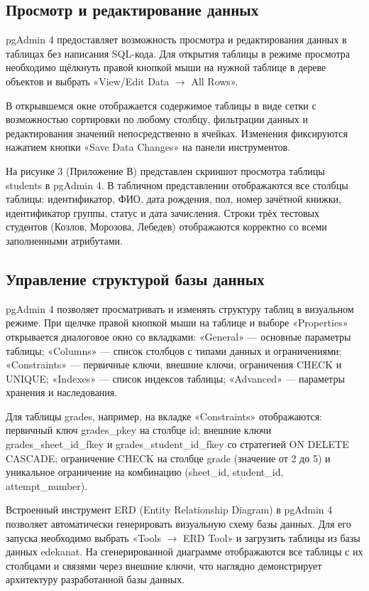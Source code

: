 \documentclass[14pt, a4paper]{extreport}
\begin{document}
\subsection{Просмотр и редактирование данных}
pgAdmin 4 предоставляет возможность просмотра и редактирования данных в таблицах без написания SQL-кода. Для открытия таблицы в режиме просмотра необходимо щёлкнуть правой кнопкой мыши на нужной таблице в дереве объектов и выбрать «View/Edit Data $\rightarrow$ All Rows».

В открывшемся окне отображается содержимое таблицы в виде сетки с возможностью сортировки по любому столбцу, фильтрации данных и редактирования значений непосредственно в ячейках. Изменения фиксируются нажатием кнопки «Save Data Changes» на панели инструментов.

На рисунке 3 (Приложение В) представлен скриншот просмотра таблицы students в pgAdmin 4. В табличном представлении отображаются все столбцы таблицы: идентификатор, ФИО, дата рождения, пол, номер зачётной книжки, идентификатор группы, статус и дата зачисления. Строки трёх тестовых студентов (Козлов, Морозова, Лебедев) отображаются корректно со всеми заполненными атрибутами.

\subsection{Управление структурой базы данных}
pgAdmin 4 позволяет просматривать и изменять структуру таблиц в визуальном режиме. При щелчке правой кнопкой мыши на таблице и выборе «Properties» открывается диалоговое окно со вкладками: «General» --- основные параметры таблицы; «Columns» --- список столбцов с типами данных и ограничениями; «Constraints» --- первичные ключи, внешние ключи, ограничения CHECK и UNIQUE; «Indexes» --- список индексов таблицы; «Advanced» --- параметры хранения и наследования.

Для таблицы grades, например, на вкладке «Constraints» отображаются: первичный ключ grades\_pkey на столбце id; внешние ключи grades\_sheet\_id\_fkey и grades\_student\_id\_fkey со стратегией ON DELETE CASCADE; ограничение CHECK на столбце grade (значение от 2 до 5) и уникальное ограничение на комбинацию (sheet\_id, student\_id, attempt\_number).

Встроенный инструмент ERD (Entity Relationship Diagram) в pgAdmin 4 позволяет автоматически генерировать визуальную схему базы данных. Для его запуска необходимо выбрать «Tools $\rightarrow$ ERD Tool» и загрузить таблицы из базы данных edekanat. На сгенерированной диаграмме отображаются все таблицы с их столбцами и связями через внешние ключи, что наглядно демонстрирует архитектуру разработанной базы данных.
\end{document}
